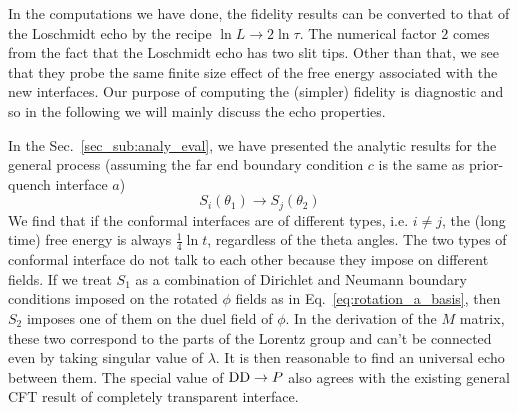 

In the computations we have done, the fidelity results can be converted to that of the Loschmidt echo by the recipe $ \ln L \rightarrow 2 \ln \tau$. The numerical factor $2$ comes from the fact that the Loschmidt echo has two slit tips. Other than that, we see that they probe the same finite size effect of the free energy associated with the new interfaces. Our purpose of computing the (simpler) fidelity is diagnostic and so in the following we will mainly discuss the echo properties. 

In the Sec.~\ref{sec_sub:analy_eval}, we have presented the analytic results for the general process (assuming the far end boundary condition $c$ is the same as prior-quench interface $a$) 
\begin{equation}
 S_i( \theta_1 ) \rightarrow S_j( \theta_2 )
\end{equation}
We find that if the conformal interfaces are of different types, i.e. $i \ne j$, the (long time) free energy is always $\frac{1}{4} \ln t$, regardless of the theta angles. The two types of conformal interface do not talk to each other because they impose on different fields. If we treat $S_1$ as a combination of Dirichlet and Neumann boundary conditions imposed on the rotated $\phi$ fields as in Eq.~\eqref{eq:rotation_a_basis}, then $S_2$ imposes one of them on the duel field of $\phi$. In the derivation of the $M$ matrix, these two correspond to the parts of the Lorentz group and can't be connected even by taking singular value of $\lambda$. It is then reasonable to find an universal echo between them. The special value of ${\rm DD} \rightarrow P$ also agrees with the existing general CFT result of completely transparent interface\cite{stephan_logarithmic_2013,stephan_local_2011,vasseur_universal_2014,vasseur_crossover_2013,kennes_universal_2014}. 


